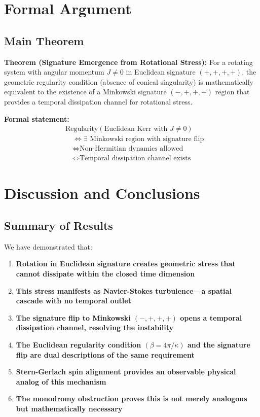 \documentclass[11pt]{article}
\begin{document}
\section{Formal Argument}

\subsection{Main Theorem}

\textbf{Theorem (Signature Emergence from Rotational Stress):}
For a rotating system with angular momentum $J \neq 0$ in Euclidean signature $(+,+,+,+)$, the geometric regularity condition (absence of conical singularity) is mathematically equivalent to the existence of a Minkowski signature $(-,+,+,+)$ region that provides a temporal dissipation channel for rotational stress.

\textbf{Formal statement:}
\begin{equation}
\boxed{
\begin{aligned}
&\text{Regularity}(\text{Euclidean Kerr with } J \neq 0) \\
&\quad \Leftrightarrow \exists \text{ Minkowski region with signature flip} \\
&\quad \Leftrightarrow \text{Non-Hermitian dynamics allowed} \\
&\quad \Leftrightarrow \text{Temporal dissipation channel exists}
\end{aligned}
}
\end{equation}

\section{Discussion and Conclusions}

\subsection{Summary of Results}

We have demonstrated that:
\begin{enumerate}
\item \textbf{Rotation in Euclidean signature creates geometric stress that cannot dissipate within the closed time dimension}
\item \textbf{This stress manifests as Navier-Stokes turbulence---a spatial cascade with no temporal outlet}
\item \textbf{The signature flip to Minkowski $(-,+,+,+)$ opens a temporal dissipation channel, resolving the instability}
\item \textbf{The Euclidean regularity condition $(\beta = 4\pi/\kappa)$ and the signature flip are dual descriptions of the same requirement}
\item \textbf{Stern-Gerlach spin alignment provides an observable physical analog of this mechanism}
\item \textbf{The monodromy obstruction proves this is not merely analogous but mathematically necessary}
\end{enumerate}
\end{document}
